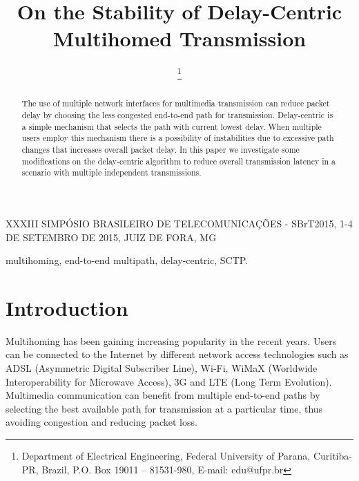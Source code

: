 \documentclass{sbrt2015}
\begin{document}
  \IEEEoverridecommandlockouts

  \title{On the Stability of Delay-Centric Multihomed Transmission}
  \author
  {
	\thanks{Department of Electrical Engineering, Federal University of Parana, Curitiba-PR, Brazil,
  	P.O. Box 19011 -- 81531-980, E-mail: edu@ufpr.br}
  }

  \maketitle
  
  
   {XXXIII SIMPÓSIO BRASILEIRO DE TELECOMUNICAÇÕES - SBrT2015, 1-4 DE SETEMBRO DE 2015, JUIZ DE FORA, MG}

  \begin{abstract}
    The use of multiple network interfaces for multimedia transmission can reduce packet delay by choosing the less congested end-to-end path for transmission. Delay-centric is a simple mechanism that selects the path with current lowest delay. When multiple users employ this mechanism there is a possibility of instabilities due to excessive path changes that increases overall packet delay. In this paper we investigate some modifications on the delay-centric algorithm to reduce overall transmission latency in a scenario with multiple independent transmissions.
  \end{abstract}

  \begin{keywords}
    multihoming, end-to-end multipath, delay-centric, SCTP.
  \end{keywords}


  \section{Introduction}

  Multihoming has been gaining increasing popularity in the recent years. Users can be connected to the Internet by different network access technologies such as ADSL (Asymmetric Digital Subscriber Line), Wi-Fi, WiMaX (Worldwide Interoperability for Microwave Access), 3G and LTE (Long Term Evolution). Multimedia communication can benefit from multiple end-to-end paths by selecting the best available path for transmission at a particular time, thus avoiding congestion and reducing packet loss.
\end{document}

